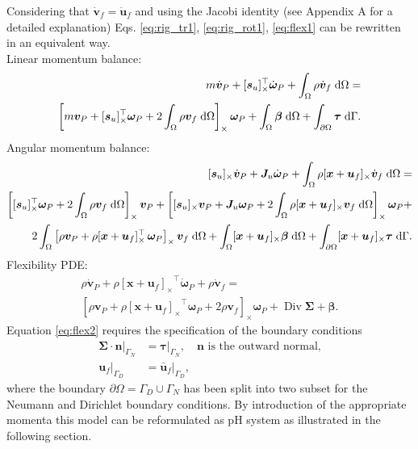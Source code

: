 \documentclass{svjour3}                     %
\DeclareMathOperator*{\Div}{Div}
\newcommand{\crmat}[1]{\ensuremath{[#1]_{\times}}}
\begin{document}
Considering that $\dot{\bm{v}}_f = \ddot{\bm{u}}_f$ and using the Jacobi identity (see Appendix A for a detailed explanation) Eqs. \eqref{eq:rig_tr1}, \eqref{eq:rig_rot1}, \eqref{eq:flex1} can be rewritten in an equivalent way. \\
Linear momentum balance:
\begin{equation}
\label{eq:rig_tr2}
	\begin{split}
	m\dot{\bm{v}}_P + \crmat{\bm{s}_u}^\top \dot{\bm{\omega}}_P +   \int_{\Omega} \rho \dot{\bm{v}}_f \d{\Omega}  = \\
	\left[m \bm{v}_P + \crmat{\bm{s}_u}^\top \bm\omega_P +2 \int_{\Omega} \rho \bm{v}_f \d{\Omega} \right]_\times \bm\omega_P +  \int_{\Omega} \bm\beta \d{\Omega} + \int_{\partial \Omega} \bm\tau \d{\Gamma}.
	\end{split}
\end{equation}
Angular momentum balance:
\begin{equation}
\label{eq:rig_rot2}
\begin{split}
\crmat{\bm{s}_u} \dot{\bm{v}}_P  + \bm{J}_u \dot{\bm\omega}_P + \int_{\Omega} \rho \crmat{\bm{x}+\bm{u}_f} \dot{\bm{v}}_f \d{\Omega} = \\
\left[\crmat{\bm{s}_u}^\top \bm\omega_P + 2 \int_{\Omega} \rho \bm{v}_f \d{\Omega} \right]_\times \bm{v}_P + \left[\crmat{\bm{s}_u} \bm{v}_P + \bm{J}_u \bm\omega_P + 2 \int_{\Omega} \rho \crmat{\bm{x}+\bm{u}_f} {\bm{v}}_f \d{\Omega} \right]_\times \bm\omega_P + 
\\
2 \int_{\Omega} \left[\rho \bm{v}_P + \rho \crmat{\bm{x}+\bm{u}_f}^\top \, \bm\omega_P \right]_\times \bm{v}_f \d{\Omega} + \int_{\Omega}\crmat{\bm{x}+\bm{u}_f} \bm\beta \d{\Omega} + \int_{\partial \Omega}\crmat{\bm{x}+\bm{u}_f} \bm{\tau} \d{\Gamma}.
\end{split}
\end{equation}
Flexibility PDE:
\begin{equation}
\label{eq:flex2}
\begin{split}
\rho \dot{\bm{v}}_P + \rho \crmat{\bm{x}+\bm{u}_f}^\top \dot{\bm\omega}_P  + \rho \dot{\bm{v}}_f = \\
\left[\rho \bm{v}_P + \rho \crmat{\bm{x}+\bm{u}_f}^\top \bm\omega_P + 2 \rho \bm{v}_f \right]_\times \bm\omega_P + \Div{\bm\Sigma} + \bm\beta.
\end{split}
\end{equation}
Equation \eqref{eq:flex2}  requires the specification of the boundary conditions
\begin{equation}
\begin{aligned}
\bm\Sigma \cdot \bm{n}|_{\Gamma_N} &= \bm\tau|_{\Gamma_N}, \quad \text{$\bm{n}$ is the outward normal,} \\
\bm{u}_f|_{\Gamma_D} &= \bm{\bar{u}}_f|_{\Gamma_D},
\end{aligned}
\end{equation}
where the boundary $\partial \Omega = \Gamma_D \cup \Gamma_N$ has been split into two subset for the Neumann and Dirichlet boundary conditions. By introduction of the appropriate momenta this model can be reformulated as pH system as illustrated in the following section.
\end{document}
